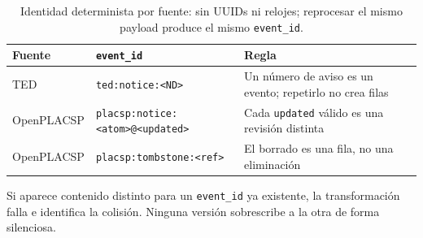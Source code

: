 \documentclass[11pt,a4paper]{article}
\newcommand{\cabecera}[1]{{\bfseries #1}}
\begin{document}
\begin{table}[ht]
\centering
\small
\begin{tabularx}{\textwidth}{@{}l l X@{}}
\toprule
\cabecera{Fuente} & \cabecera{\texttt{event\_id}} & \cabecera{Regla}\\
\midrule
TED & \texttt{ted:notice:<ND>} & Un número de aviso es un evento; repetirlo no crea filas\\
OpenPLACSP & \texttt{placsp:notice:<atom>@<updated>} & Cada \texttt{updated} válido es una revisión distinta\\
OpenPLACSP & \texttt{placsp:tombstone:<ref>} & El borrado es una fila, no una eliminación\\
\bottomrule
\end{tabularx}
\caption{Identidad determinista por fuente: sin UUIDs ni relojes; reprocesar el
mismo payload produce el mismo \texttt{event\_id}.}
\end{table}

Si aparece contenido distinto para un \texttt{event\_id} ya existente, la
transformación falla e identifica la colisión. Ninguna versión sobrescribe a
la otra de forma silenciosa.
\end{document}
